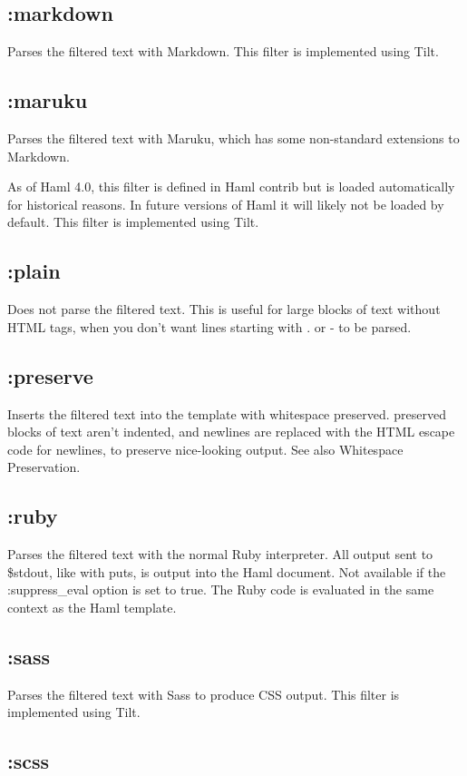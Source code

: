 \documentclass[9pt]{article}
\begin{document}
\subsection{:markdown}


 Parses the filtered text with Markdown. This filter is implemented using Tilt.
\subsection{:maruku}


 Parses the filtered text with Maruku, which has some non-standard extensions to Markdown.


 As of Haml 4.0, this filter is defined in Haml contrib but is loaded automatically for historical reasons. In future versions of Haml it will likely not be loaded by default. This filter is implemented using Tilt.
\subsection{:plain}


 Does not parse the filtered text. This is useful for large blocks of text without HTML tags, when you don’t want lines starting with . or - to be parsed.
\subsection{:preserve}


 Inserts the filtered text into the template with whitespace preserved. preserved blocks of text aren’t indented, and newlines are replaced with the HTML escape code for newlines, to preserve nice-looking output. See also Whitespace Preservation.
\subsection{:ruby}


 Parses the filtered text with the normal Ruby interpreter. All output sent to \$stdout, like with puts, is output into the Haml document. Not available if the :suppress\_eval option is set to true. The Ruby code is evaluated in the same context as the Haml template.
\subsection{:sass}


 Parses the filtered text with Sass to produce CSS output. This filter is implemented using Tilt.
\subsection{:scss}
\end{document}
